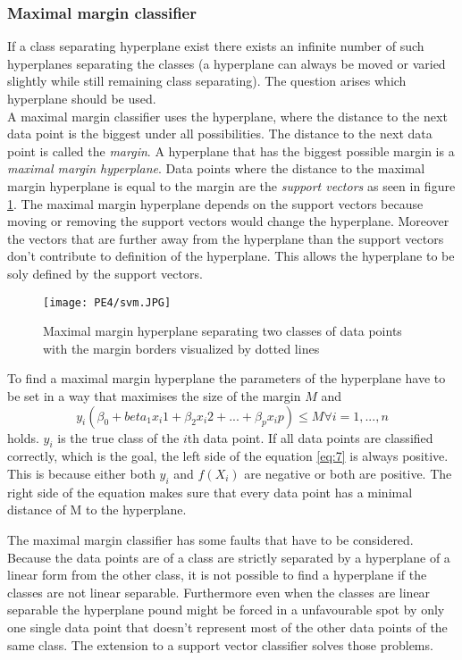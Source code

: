 \subsubsection{Maximal margin classifier}

If a class separating hyperplane exist there exists an infinite number of such hyperplanes separating the classes (a hyperplane can always be moved or varied slightly while still remaining class separating). The question arises which hyperplane should be used. 
\\
A maximal margin classifier uses the hyperplane, where the distance to the next data point  is the biggest under all possibilities. The distance to the next data point is called the \emph{margin}. A hyperplane that has the biggest possible margin is a \emph{maximal margin hyperplane}. Data points where the distance to the maximal margin hyperplane is equal to the margin are the \emph{support vectors} as seen in figure \ref{fig:mmh}. The maximal margin hyperplane depends on the support vectors because moving or removing the support vectors would change the hyperplane. Moreover the vectors that are further away from the hyperplane than the support vectors don't contribute to definition of the hyperplane. This allows the hyperplane to be soly defined by the support vectors.\\

\begin{figure}[h]
\centering
\texttt{[image: PE4/svm.JPG]}
\caption{Maximal margin hyperplane separating two classes of data points with the margin borders visualized by dotted lines}
\label{fig:mmh}
\end{figure}

To find a maximal margin hyperplane the parameters of the hyperplane have to be set in a way that maximises the size of the margin $M$ and
\begin{equation} \label{eq:7}
y_i(\beta_0+beta_1 x_i1 +\beta_2 x_i2 + ... +\beta_p x_ip) \leq M   \forall i=1,...,n
\end{equation}
holds.
$y_i$ is the true class of the $i$th data point. If all data points are classified correctly, which is the goal, the left side of the equation \ref{eq:7} is always positive. This is because either both $y_i$ and $f(X_i)$ are negative or both are positive. The right side of the equation makes sure that every data point has a minimal distance of M to the hyperplane.

The maximal margin classifier has some faults that have to be considered. Because the data points are of a class are strictly separated by a hyperplane of a linear form from the other class, it is not possible to find a hyperplane if the classes are not linear separable.  Furthermore even when the classes are linear separable the hyperplane pound might be forced in a unfavourable spot by only one single data point that doesn't represent most of the other data points of the same class. The extension to a support vector classifier solves those problems.

